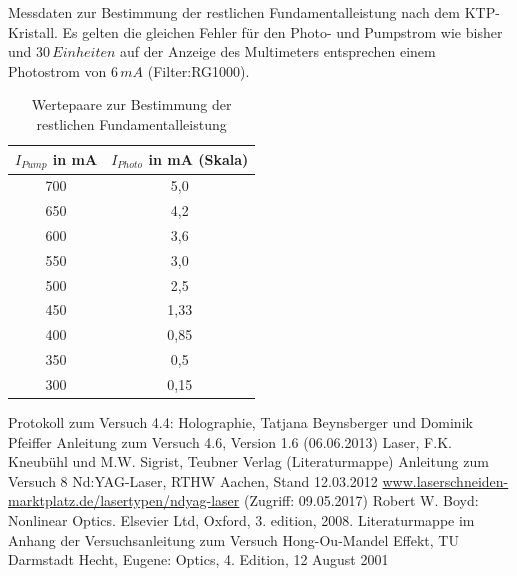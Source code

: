 \documentclass[twoside,colorback,accentcolor=tud4c,11pt]{tudreport}
\begin{document}
Messdaten zur Bestimmung der restlichen Fundamentalleistung nach dem KTP-Kristall. Es gelten die gleichen Fehler für den Photo- und Pumpstrom wie bisher und $30\,\si{Einheiten}$ auf der Anzeige des Multimeters entsprechen einem Photostrom von $6\,\si{mA}$ (Filter:RG1000).
\begin{table}[H]
\renewcommand*{\arraystretch}{1.2}
\centering
\begin{tabular}{|c|c|}
\hline 
$I_{Pump}$ in mA & $I_{Photo}$ in mA (Skala)\\
\hline 
700 & 5,0  \\ 
\hline 
650 & 4,2  \\ 
\hline 
600 & 3,6  \\ 
\hline 
550 & 3,0  \\ 
\hline 
500 & 2,5  \\ 
\hline
450 & 1,33 \\ 
\hline
400 & 0,85 \\ 
\hline
350 & 0,5 \\ 
\hline
300 & 0,15 \\ 
\hline
\end{tabular} 
\caption{Wertepaare zur Bestimmung der restlichen Fundamentalleistung}\label{restfund}
\end{table}



		

\renewcommand{\bibname}{Literatur}
\begin{thebibliography}{0}
 Protokoll zum Versuch 4.4: Holographie, Tatjana Beynsberger und Dominik Pfeiffer 
 Anleitung zum Versuch 4.6, Version 1.6 (06.06.2013)
 Laser, F.K. Kneubühl und M.W. Sigrist, Teubner Verlag (Literaturmappe)
 Anleitung zum Versuch 8 Nd:YAG-Laser, RTHW Aachen, Stand 12.03.2012
 \url{www.laserschneiden-marktplatz.de/lasertypen/ndyag-laser} (Zugriff: 09.05.2017)
 Robert W. Boyd: Nonlinear Optics. Elsevier Ltd, Oxford, 3. edition, 2008.
 Literaturmappe im Anhang der Versuchsanleitung zum Versuch Hong-Ou-Mandel Effekt, TU Darmstadt
 Hecht, Eugene: Optics, 4. Edition, 12 August 2001
\end{thebibliography} 	
\end{document}
